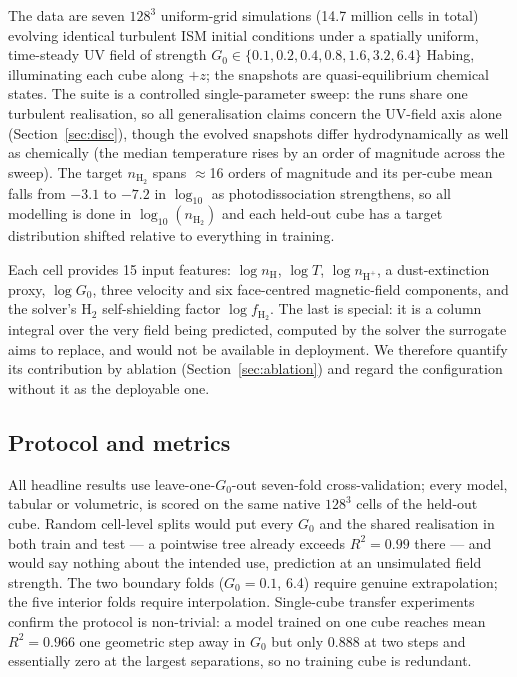 \documentclass[fleqn,usenatbib]{rasti}
\newcommand{\nHH}{n_{\mathrm{H_2}}}
\newcommand{\logn}{\log_{10}(n_{\mathrm{H_2}})}
\newcommand{\Gzero}{G_0}
\newcommand{\fshield}{f_{\mathrm{H_2}}}
\newcommand{\Rsq}{R^2}
\begin{document}
The data are seven \(128^3\) uniform-grid simulations (14.7 million cells
in total) evolving identical turbulent ISM initial conditions under a
spatially uniform, time-steady UV field of strength
\(\Gzero \in \{0.1, 0.2, 0.4, 0.8, 1.6, 3.2, 6.4\}\) Habing, illuminating
each cube along \(+z\); the snapshots are quasi-equilibrium chemical
states. The suite is a controlled single-parameter sweep: the runs share
one turbulent realisation, so all generalisation claims concern the
UV-field axis alone (Section~\ref{sec:disc}), though the evolved
snapshots differ hydrodynamically as well as chemically (the median
temperature rises by an order of magnitude across the sweep). The target
\(\nHH\) spans \(\approx\)16 orders of magnitude and its per-cube mean
falls from \(-3.1\) to \(-7.2\) in \(\log_{10}\) as photodissociation
strengthens, so all modelling is done in \(\logn\) and each held-out cube
has a target distribution shifted relative to everything in training.

Each cell provides 15 input features: \(\log n_{\mathrm{H}}\), \(\log T\),
\(\log n_{\mathrm{H^+}}\), a dust-extinction proxy, \(\log\Gzero\), three
velocity and six face-centred magnetic-field components, and the
solver's H\(_2\) self-shielding factor \(\log\fshield\). The last is
special: it is a column integral over the very field being predicted,
computed by the solver the surrogate aims to replace, and would not be
available in deployment. We therefore quantify its contribution by
ablation (Section~\ref{sec:ablation}) and regard the configuration
without it as the deployable one.

\subsection{Protocol and metrics}
\label{sec:metrics}

All headline results use leave-one-\(\Gzero\)-out seven-fold
cross-validation; every model, tabular or volumetric, is scored on the
same native \(128^3\) cells of the held-out cube. Random cell-level
splits would put every \(\Gzero\) and the shared realisation in both
train and test --- a pointwise tree already exceeds \(\Rsq = 0.99\) there
--- and would say nothing about the intended use, prediction at an
unsimulated field strength. The two boundary folds (\(\Gzero = 0.1\),
6.4) require genuine extrapolation; the five interior folds require
interpolation. Single-cube transfer experiments confirm the protocol is
non-trivial: a model trained on one cube reaches mean \(\Rsq = 0.966\)
one geometric step away in \(\Gzero\) but only 0.888 at two steps and
essentially zero at the largest separations, so no training cube is
redundant.
\end{document}
